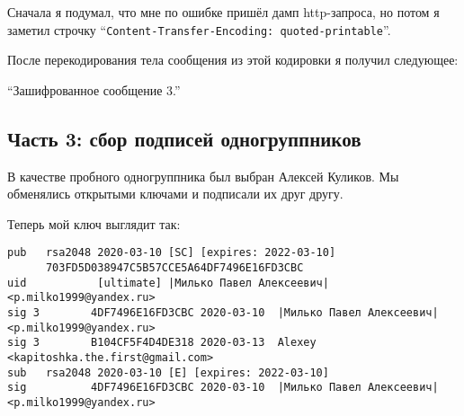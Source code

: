 \documentclass[12pt]{article}
\newcommand{\pa}[1]{\subsection*{\bf #1}}
\newcommand{\printPlain}[1]{\smallbreak{\large \bf  #1}
	{\scriptsize
		\setlength{\parindent}{0pt}
		
	}
}
\begin{document}
\printPlain{t3/decrypted.txt}

Сначала я подумал, что мне по ошибке пришёл дамп http-запроса, но потом я заметил строчку ``\lstinline|Content-Transfer-Encoding: quoted-printable|''.

После перекодирования тела сообщения из этой кодировки я получил следующее:

``Зашифрованное сообщение 3.''

\pa{Часть 3: сбор подписей одногруппников}

В качестве пробного одногруппника был выбран Алексей Куликов. Мы обменялись открытыми ключами и подписали их друг другу.

Теперь мой ключ выглядит так:
{
\scriptsize
\begin{lstlisting}[escapechar=|,breaklines=true]
pub   rsa2048 2020-03-10 [SC] [expires: 2022-03-10]
      703FD5D038947C5B57CCE5A64DF7496E16FD3CBC
uid           [ultimate] |Милько Павел Алексеевич| <p.milko1999@yandex.ru>
sig 3        4DF7496E16FD3CBC 2020-03-10  |Милько Павел Алексеевич| <p.milko1999@yandex.ru>
sig 3        B104CF5F4D4DE318 2020-03-13  Alexey <kapitoshka.the.first@gmail.com>
sub   rsa2048 2020-03-10 [E] [expires: 2022-03-10]
sig          4DF7496E16FD3CBC 2020-03-10  |Милько Павел Алексеевич| <p.milko1999@yandex.ru>
\end{lstlisting}
}
\end{document}
